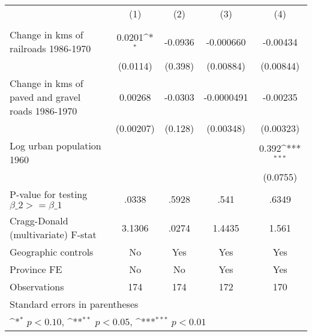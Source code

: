 {
\def\sym#1{\ifmmode^{#1}\else\(^{#1}\)\fi}
\begin{tabular}{l*{4}{c}}
\hline\hline
                &\multicolumn{1}{c}{(1)}&\multicolumn{1}{c}{(2)}&\multicolumn{1}{c}{(3)}&\multicolumn{1}{c}{(4)}\\
                &\multicolumn{1}{c}{}&\multicolumn{1}{c}{}&\multicolumn{1}{c}{}&\multicolumn{1}{c}{}\\
\hline
Change in kms of railroads 1986-1970&   0.0201\sym{*}  &  -0.0936         &-0.000660         & -0.00434         \\
                & (0.0114)         &  (0.398)         &(0.00884)         &(0.00844)         \\
[1em]
Change in kms of paved and gravel roads 1986-1970&  0.00268         &  -0.0303         &-0.0000491         & -0.00235         \\
                &(0.00207)         &  (0.128)         &(0.00348)         &(0.00323)         \\
[1em]
Log urban population 1960&                  &                  &                  &    0.392\sym{***}\\
                &                  &                  &                  & (0.0755)         \\
\hline
P-value for testing $\beta\_{2} >= \beta\_{1}$&    .0338         &    .5928         &     .541         &    .6349         \\
Cragg-Donald (multivariate) F-stat&   3.1306         &    .0274         &   1.4435         &    1.561         \\
Geographic controls&       No         &      Yes         &      Yes         &      Yes         \\
Province FE     &       No         &       No         &      Yes         &      Yes         \\
Observations    &      174         &      174         &      172         &      170         \\
\hline\hline
\multicolumn{5}{l}{\footnotesize Standard errors in parentheses}\\
\multicolumn{5}{l}{\footnotesize \sym{*} \(p<0.10\), \sym{**} \(p<0.05\), \sym{***} \(p<0.01\)}\\
\end{tabular}
}
